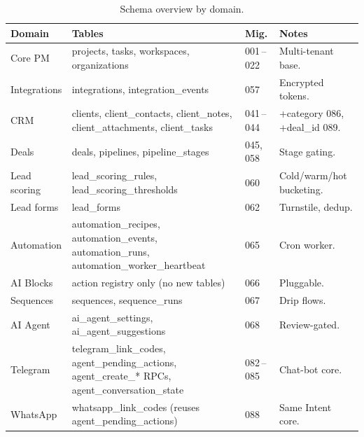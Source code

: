 \documentclass[11pt,a4paper,oneside]{article}
\newcommand{\dash}{\,--\,}
\begin{document}
\begin{table}[H]
\centering
\footnotesize
\begin{tabularx}{\textwidth}{@{}lXll@{}}
\toprule
\textbf{Domain}  & \textbf{Tables}                                                                                  & \textbf{Mig.}   & \textbf{Notes} \\
\midrule
Core PM          & projects, tasks, workspaces, organizations                                                       & 001\dash 022    & Multi-tenant base. \\
Integrations     & integrations, integration\_events                                                                & 057             & Encrypted tokens. \\
CRM              & clients, client\_contacts, client\_notes, client\_attachments, client\_tasks                     & 041\dash 044    & +category 086, +deal\_id 089. \\
Deals            & deals, pipelines, pipeline\_stages                                                                & 045, 058        & Stage gating. \\
Lead scoring     & lead\_scoring\_rules, lead\_scoring\_thresholds                                                  & 060             & Cold/warm/hot bucketing. \\
Lead forms       & lead\_forms                                                                                       & 062             & Turnstile, dedup. \\
Automation       & automation\_recipes, automation\_events, automation\_runs, automation\_worker\_heartbeat        & 065             & Cron worker. \\
AI Blocks        & action registry only (no new tables)                                                              & 066             & Pluggable. \\
Sequences        & sequences, sequence\_runs                                                                         & 067             & Drip flows. \\
AI Agent         & ai\_agent\_settings, ai\_agent\_suggestions                                                       & 068             & Review-gated. \\
Telegram         & telegram\_link\_codes, agent\_pending\_actions, agent\_create\_* RPCs, agent\_conversation\_state & 082\dash 085   & Chat-bot core. \\
WhatsApp         & whatsapp\_link\_codes (reuses agent\_pending\_actions)                                            & 088             & Same Intent core. \\
\bottomrule
\end{tabularx}
\caption{Schema overview by domain.}
\label{tab:schema}
\end{table}
\end{document}
